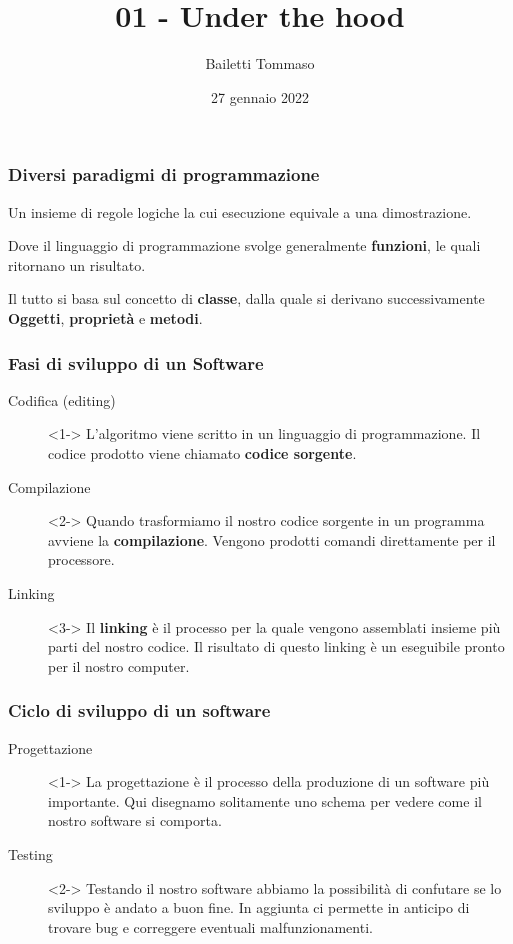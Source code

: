 \documentclass{beamer}
\title{01 - Under the hood}
\author{Bailetti Tommaso}
\institute{ITI Don Orione}
\date{27 gennaio 2022}
\begin{document}
    \begin{frame}
        \titlepage
    \end{frame}

    \begin{frame}
        \frametitle{Diversi paradigmi di programmazione}
    
        \begin{description}
            \item<1-> [Logica] Un insieme di regole logiche la cui esecuzione equivale a una dimostrazione.
            \item<2-> [Imperativa/Funzionale] Dove il linguaggio di programmazione svolge generalmente \textbf{funzioni}, le quali ritornano un risultato.
            \item<3-> [Oggetti] Il tutto si basa sul concetto di \textbf{classe}, dalla quale si derivano successivamente \textbf{Oggetti}, \textbf{proprietà} e \textbf{metodi}.
        \end{description}
    
    \end{frame}
    
    \begin{frame}
        \frametitle{Fasi di sviluppo di un Software}
    
        \begin{description}
            \item[Codifica (editing)]<1-> L'algoritmo viene scritto in un linguaggio di programmazione. Il codice prodotto viene chiamato \textbf{codice sorgente}.
            \item[Compilazione]<2-> Quando trasformiamo il nostro codice sorgente in un programma avviene la \textbf{compilazione}. Vengono prodotti comandi direttamente per il processore.
            \item[Linking]<3-> Il \textbf{linking} è il processo per la quale vengono assemblati insieme più parti del nostro codice. Il risultato di questo linking è un eseguibile pronto per il nostro computer.
        \end{description}
    
    \end{frame}

    \begin{frame}
        \frametitle{Ciclo di sviluppo di un software}
    
        \begin{description}
            \item[Progettazione]<1-> La progettazione è il processo della produzione di un software più importante. Qui disegnamo solitamente uno schema per vedere come il nostro software si comporta.
            \item[Testing]<2-> Testando il nostro software abbiamo la possibilità di confutare se lo sviluppo è andato a buon fine. In aggiunta ci permette in anticipo di trovare bug e correggere eventuali malfunzionamenti.
        \end{description}
    \end{frame}
\end{document}
